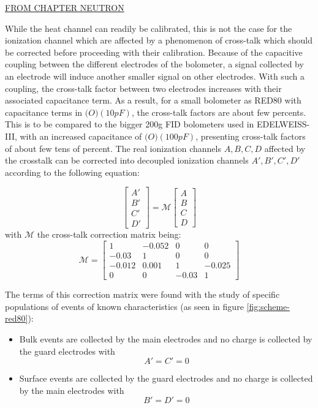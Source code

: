 \underline{FROM CHAPTER NEUTRON} 

While the heat channel can readily be calibrated, this is not the case for the ionization channel which are affected by a phenomenon of cross-talk which should be corrected before proceeding with their calibration.
Because of the capacitive coupling between the different electrodes of the bolometer, a signal collected by an electrode will induce another smaller signal on other electrodes. With such a coupling, the cross-talk factor between two electrodes increases with their associated capacitance term.
As a result, for a small bolometer as RED80 with capacitance terms in $\mathcal(O)(10 pF)$, the cross-talk factors are about few percents. This is to be compared to the bigger 200g FID bolometers used in EDELWEISS-III, with an increased capacitance of $\mathcal(O)(100 pF)$, presenting cross-talk factors of about few tens of percent.
The real ionization channels $A,B,C,D$ affected by the crosstalk can be corrected into decoupled ionization channels $A', B', C', D'$ according to the following equation:

\begin{equation}
	\left[\begin{array}{c}
	A' \\ 
	B' \\ 
	C' \\ 
	D'
	\end{array}\right]
	=
	\mathcal{M}
	\left[\begin{array}{c}
	A \\ 
	B \\ 
	C \\ 
	D
	\end{array} \right]
\end{equation}
with $\mathcal{M}$ the cross-talk correction matrix being:
\begin{equation}
	\mathcal{M}
	=
	\left[\begin{array}{cccc}
	1 & -0.052 & 0 & 0 \\ 
	-0.03 & 1 & 0 & 0 \\ 
	-0.012 & 0.001 & 1 & -0.025 \\ 
	0 & 0 & -0.03 & 1
	\end{array}\right]
\end{equation}

The terms of this correction matrix were found with the study of specific populations of events of known characteristics (as seen in figure \ref{fig:scheme-red80}):
\begin{itemize}
	\item Bulk events are collected by the main electrodes and no charge is collected by the guard electrodes with $$A'= C' = 0$$
	\item Surface events are collected by the guard electrodes and no charge is collected by the main electrodes with $$B' = D' = 0$$
\end{itemize}

